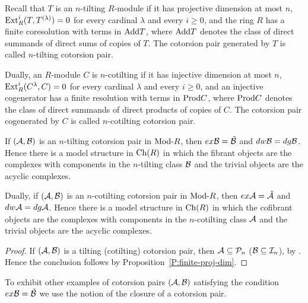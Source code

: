  Recall that $T$ is an $n$-tilting $R$-module if it has projective dimension at most $n$, $\operatorname{Ext}^i_R(T, T^{(\lambda)})=0$ for every cardinal $\lambda$ and every $i\geq 0$, and  the ring $R$ has a finite coresolution with terms in $\mathrm{Add} T$, where $\mathrm{Add} T$ denotes the class of direct summands of direct sums of copies of $T$.
 The cotorsion pair generated by $T$ is called $n$-tilting cotorsion pair.

 Dually, an $R$-module $C$ is $n$-cotilting if it has injective dimension at most $n$, $\operatorname{Ext}^i_R(C^{\lambda}, C)=0$ for every cardinal $\lambda$ and every $i\geq 0$, and  an injective cogenerator has a finite resolution with terms in $\mathrm{Prod} C$, where $\mathrm{Prod} C$ denotes the class of direct summands of direct products of copies of $C$.
 The cotorsion pair cogenerated by $C$ is called $n$-cotilting cotorsion pair.

  \begin{prop}\label{P:tilt-cotil} If $(\mathcal{A}, \mathcal{B})$ is an $n$-tilting cotorsion pair in $\mathrm{Mod}\textrm{-}{R}$, then $ex\mathcal{B}= \tilde {\mathcal{B}}$ and $dw\mathcal{B}=dg\mathcal{B}$. Hence there is a model structure in $\mathrm{Ch}(R)$ in which the fibrant objects are the complexes with components in the  $n$-tilting class $\mathcal{B}$ and the trivial objects are the acyclic complexes.

 Dually, if $(\mathcal{A}, \mathcal{B})$ is an $n$-cotilting cotorsion pair in $\mathrm{Mod}\textrm{-}{R}$, then $ex\mathcal{A}= \tilde {\mathcal{A}}$ and $dw\mathcal{A}=dg\mathcal{A}$.
 Hence there is a model structure in $\mathrm{Ch}(R)$ in which the cofibrant objects are the complexes with components in the  $n$-cotilting class $\mathcal{A}$ and the trivial objects are the acyclic complexes.
 \end{prop}

%
\begin{proof} If $(\mathcal{A}, \mathcal{B})$ is a tilting (cotilting) cotorsion pair, then $\mathcal{A}\subseteq \mathcal{P}_n$ ($\mathcal{B}\subseteq \mathcal{I}_n$), by \cite[Lemmas 13.10, 15.4]{GT12}. Hence the conclusion follows by Proposition~\ref{P:finite-proj-dim}.
\end{proof}
%
%
%
To exhibit other examples of cotorsion pairs $(\mathcal{A}, \mathcal{B})$ satisfying the condition $ex\mathcal{B}=\tilde {\mathcal{B}}$ we use the notion of the closure of a cotorsion pair.

